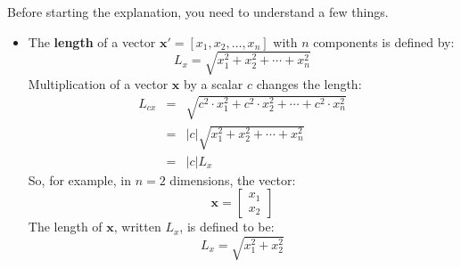 \documentclass[a4paper]{article}
\newcommand{\definition}[1]{\textcolor{Red3}{\textbf{#1}}\index{#1}}
\begin{document}
    Before starting the explanation, you need to understand a few things.
    \begin{itemize}
        \item The \definition{length} of a vector $\mathbf{x}'=\left[x_{1}, x_{2}, \dots, x_{n}\right]$ with $n$ components is defined by:
        \begin{equation}\label{eq: length of a vector}
            L_{x} = \sqrt{x_{1}^{2} + x_{2}^{2} + \cdots + x_{n}^{2}}
        \end{equation}
        Multiplication of a vector $\mathbf{x}$ by a scalar $c$ changes the length:
        \begin{equation*}
            \begin{array}{rcl}
                L_{cx} &=& \sqrt{c^{2} \cdot x_{1}^{2} + c^{2} \cdot x_{2}^{2} + \cdots + c^{2} \cdot x_{n}^{2}} \\ [.3em]
                &=& \left| c \right| \sqrt{x_{1}^{2} + x_{2}^{2} + \cdots + x_{n}^{2}} \\ [.3em] 
                &=& \left| c \right| L_{x}
            \end{array}
        \end{equation*}
        So, for example, in $n = 2$ dimensions, the vector:
        \begin{equation*}
            \mathbf{x} = \begin{bmatrix}
                x_{1} \\ x_{2}
            \end{bmatrix}
        \end{equation*}
        The length of $\mathbf{x}$, written $L_{x}$, is defined to be:
        \begin{equation*}
            L_{x} = \sqrt{x_{1}^{2} + x_{2}^{2}}
        \end{equation*}

        \newpage


\end{itemize}
\end{document}
